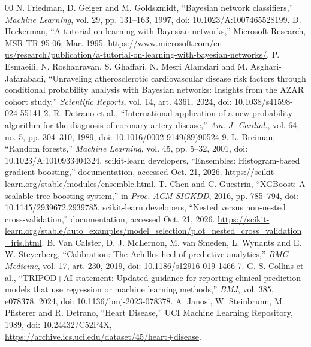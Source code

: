 \documentclass[conference]{IEEEtran}
\begin{document}
\begin{thebibliography}{00}
 N. Friedman, D. Geiger and M. Goldszmidt, ``Bayesian network classifiers,'' \emph{Machine Learning}, vol. 29, pp. 131--163, 1997, doi: 10.1023/A:1007465528199.
 D. Heckerman, ``A tutorial on learning with Bayesian networks,'' Microsoft Research, MSR-TR-95-06, Mar. 1995. \url{https://www.microsoft.com/en-us/research/publication/a-tutorial-on-learning-with-bayesian-networks/}.
 P. Esmaeili, N. Roshanravan, S. Ghaffari, N. Mesri Alamdari and M. Asghari-Jafarabadi, ``Unraveling atherosclerotic cardiovascular disease risk factors through conditional probability analysis with Bayesian networks: Insights from the AZAR cohort study,'' \emph{Scientific Reports}, vol. 14, art. 4361, 2024, doi: 10.1038/s41598-024-55141-2.
 R. Detrano et al., ``International application of a new probability algorithm for the diagnosis of coronary artery disease,'' \emph{Am. J. Cardiol.}, vol. 64, no. 5, pp. 304--310, 1989, doi: 10.1016/0002-9149(89)90524-9.
 L. Breiman, ``Random forests,'' \emph{Machine Learning}, vol. 45, pp. 5--32, 2001, doi: 10.1023/A:1010933404324.
 scikit-learn developers, ``Ensembles: Histogram-based gradient boosting,'' documentation, accessed Oct. 21, 2026. \url{https://scikit-learn.org/stable/modules/ensemble.html}.
 T. Chen and C. Guestrin, ``XGBoost: A scalable tree boosting system,'' in \emph{Proc. ACM SIGKDD}, 2016, pp. 785--794, doi: 10.1145/2939672.2939785.
 scikit-learn developers, ``Nested versus non-nested cross-validation,'' documentation, accessed Oct. 21, 2026. \url{https://scikit-learn.org/stable/auto_examples/model_selection/plot_nested_cross_validation_iris.html}.
 B. Van Calster, D. J. McLernon, M. van Smeden, L. Wynants and E. W. Steyerberg, ``Calibration: The Achilles heel of predictive analytics,'' \emph{BMC Medicine}, vol. 17, art. 230, 2019, doi: 10.1186/s12916-019-1466-7.
 G. S. Collins et al., ``TRIPOD+AI statement: Updated guidance for reporting clinical prediction models that use regression or machine learning methods,'' \emph{BMJ}, vol. 385, e078378, 2024, doi: 10.1136/bmj-2023-078378.
 A. Janosi, W. Steinbrunn, M. Pfisterer and R. Detrano, ``Heart Disease,'' UCI Machine Learning Repository, 1989, doi: 10.24432/C52P4X, \url{https://archive.ics.uci.edu/dataset/45/heart+disease}.
\end{thebibliography}
\end{document}
